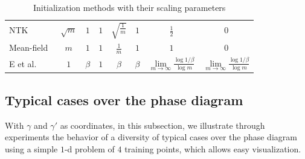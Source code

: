 \documentclass[twoside,11pt]{article}
\begin{document}
\begin{table}[ht]
\begin{tabularx}{\textwidth}{lccccccc}
        NTK~\scriptsize{\cite{jacot_neural_2018}}                                                 & $\sqrt{m}$                & $1$                        & $1$                        & $\sqrt{\frac{1}{m}}$                                & $1$                                           & $\frac{1}{2}$                                                             & $0$                                                                         \\
        Mean-field~\scriptsize{\cite{mei_mean_2018,sirignano_mean_2020,rotskoff_parameters_2018}} & $m$                       & $1$                        & $1$                        & $\frac{1}{m}$                                       & $1$                                           & $1$                                                                       & $0$                                                                         \\
        E et al.~\scriptsize{\cite{e2020comparative}}                                             & $1$                       & $\beta$                    & $1$                        & $\beta$                                             & $\beta$                                       & $\scriptscriptstyle\lim\limits_{m\to\infty}\frac{\log 1/\beta}{\log m}$   & $\scriptscriptstyle\lim\limits_{m\to\infty}\frac{\log 1/\beta}{\log m}$     \\
        \bottomrule
    \end{tabularx}
    \caption{Initialization methods with their scaling parameters}
    \label{tab..InitializationMethods}
\end{table}

\subsection{Typical cases over the phase diagram}

With $\gamma$ and $\gamma'$ as coordinates, in this subsection, we illustrate through experiments the behavior of a diversity of typical cases over the phase diagram using a simple $1$-d problem of $4$ training points, which allows easy visualization.
\end{document}
